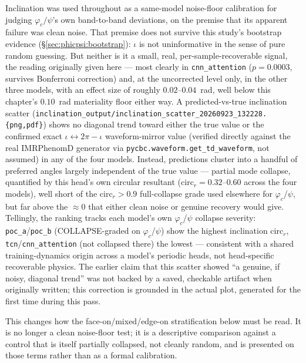 Inclination was used throughout as a same-model noise-floor calibration for judging $\varphi_c/\psi$'s own band-to-band deviations, on the premise that its apparent failure was clean noise.
That premise does not survive this study's bootstrap evidence (\S\ref{sec:phicpsi:bootstrap}): $\iota$ is not uninformative in the sense of pure random guessing.
But neither is it a small, real, per-sample-recoverable signal, the reading originally given here --- most clearly in \texttt{cnn\_attention} ($p=0.0003$, survives Bonferroni correction) and, at the uncorrected level only, in the other three models, with an effect size of roughly $0.02$--$0.04$~rad, well below this chapter's $0.10$~rad materiality floor either way.
A predicted-vs-true inclination scatter (\texttt{inclination\_output/inclination\_scatter\_20260923\_132228.\{png,pdf\}}) shows no diagonal trend toward either the true value or the confirmed exact $\iota\leftrightarrow2\pi-\iota$ waveform-mirror value (verified directly against the real IMRPhenomD generator via \texttt{pycbc.waveform.get\_td\_waveform}, not assumed) in any of the four models.
Instead, predictions cluster into a handful of preferred angles largely independent of the true value --- partial mode collapse, quantified by this head's own circular resultant ($\text{circ}_r=0.32$--$0.60$ across the four models), well short of the $\text{circ}_r>0.9$ full-collapse grade used elsewhere for $\varphi_c$/$\psi$, but far above the $\approx0$ that either clean noise or genuine recovery would give.
Tellingly, the ranking tracks each model's own $\varphi_c$/$\psi$ collapse severity: \texttt{poc\_a}/\texttt{poc\_b} (COLLAPSE-graded on $\varphi_c$/$\psi$) show the highest inclination $\text{circ}_r$, \texttt{tcn}/\texttt{cnn\_attention} (not collapsed there) the lowest --- consistent with a shared training-dynamics origin across a model's periodic heads, not head-specific recoverable physics.
The earlier claim that this scatter showed ``a genuine, if noisy, diagonal trend'' was not backed by a saved, checkable artifact when originally written; this correction is grounded in the actual plot, generated for the first time during this pass.

This changes how the face-on/mixed/edge-on stratification below must be read.
It is no longer a clean noise-floor test; it is a descriptive comparison against a control that is itself partially collapsed, not cleanly random, and is presented on those terms rather than as a formal calibration.

